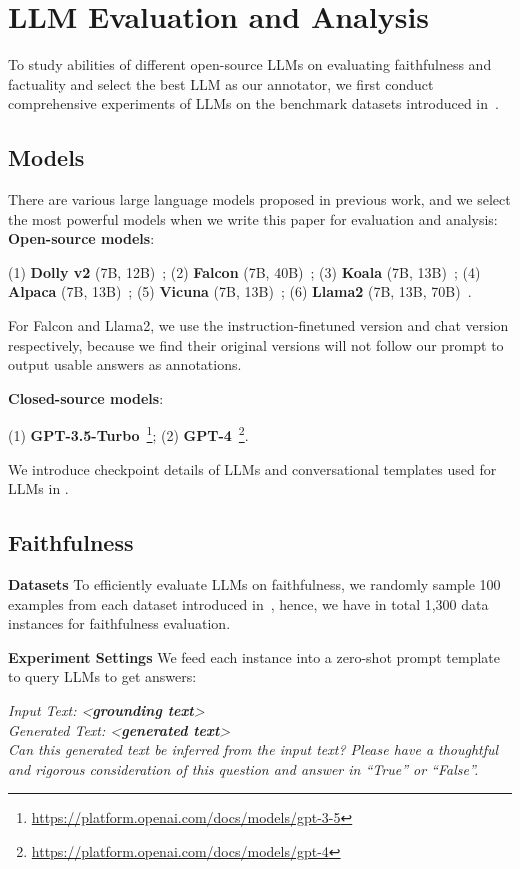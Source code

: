 \section{LLM Evaluation and Analysis}
To study abilities of different open-source LLMs on evaluating faithfulness and factuality and select the best LLM as our annotator, we first conduct comprehensive experiments of LLMs on the benchmark datasets introduced in~.
\subsection{Models}
There are various large language models proposed in previous work, and we select the most powerful models when we write this paper for evaluation and analysis:
\textbf{Open-source models}:

(1) \textbf{Dolly v2} (7B, 12B)~\cite{DatabricksBlog2023DollyV2};
(2) \textbf{Falcon} (7B, 40B)~\cite{falcon40b};
(3) \textbf{Koala} (7B, 13B)~\cite{koala_blogpost_2023};
(4) \textbf{Alpaca} (7B, 13B)~\cite{alpaca};
(5) \textbf{Vicuna} (7B, 13B)~\cite{vicuna2023};
(6) \textbf{Llama2} (7B, 13B, 70B)~\cite{Touvron2023Llama2O}.

For Falcon and Llama2, we use the instruction-finetuned version and chat version respectively, because we find their original versions will not follow our prompt to output usable answers as annotations.

\textbf{Closed-source models}:

(1) \textbf{GPT-3.5-Turbo}~\footnote{\url{https://platform.openai.com/docs/models/gpt-3-5}}; 
(2) \textbf{GPT-4}~\footnote{\url{https://platform.openai.com/docs/models/gpt-4}}.

We introduce checkpoint details of LLMs and conversational templates used for LLMs in .

\subsection{Faithfulness}
\label{sec:llm_faithful}
\textbf{Datasets}
To efficiently evaluate LLMs on faithfulness, we randomly sample 100 examples from each dataset introduced in~, hence, we have in total 1,300 data instances for faithfulness evaluation. 

\textbf{Experiment Settings}
We feed each instance into a zero-shot prompt template to query LLMs to get answers:

\textit{Input Text: <\textbf{grounding text}>\\
Generated Text: <\textbf{generated text}>\\
Can this generated text be inferred from the input text? Please have a thoughtful and rigorous consideration of this question and answer in ``True'' or ``False''.}

